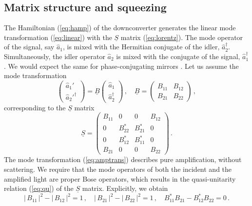 \documentclass[12pt,amsmath,amssymb]{article}
\numberwithin{equation}{section}
\begin{document}
\subsection{Matrix structure and squeezing}

The Hamiltonian (\ref{eq:hamp}) of the downconverter generates
the linear mode transformation (\ref{eq:linear}) with the
$\underline{S}$ matrix (\ref{eq:lorentz}). The mode operator of
the signal, say $\hat{a}_1$, is mixed with the Hermitian
conjugate of the idler, $\hat{a}_2^\dagger$. Simultaneously, the
idler operator $\hat{a}_2$ is mixed with the conjugate of the
signal, $\hat{a}_1^\dagger$. We would expect the same for
phase-conjugating mirrors \cite{Shen}. Let us assume the mode
transformation
\begin{equation}
\label{eq:amptrans} \left(
    \begin{array}{c}
     \hat{a}_1'  \\
     \hat{a}_2'^\dagger
    \end{array}
\right) = \underline{B} \left(
    \begin{array}{c}
     \hat{a}_1  \\
     \hat{a}_2^\dagger
    \end{array}
\right)\,,\quad \underline{B} = \left(
    \begin{array}{cc}
      B_{11} & B_{12} \\
      B_{21} & B_{22}
    \end{array}
\right)\,,
\end{equation}
corresponding to the $\underline{S}$ matrix
\begin{equation}
\label{eq:amps}
\underline{S} =
    \left(
    \begin{array}{cccc}
      B_{11}&0&0&B_{12}\\ 0&B_{22}^*&B_{21}^*&0\\
      0&B_{12}^*&B_{11}^*&0\\ B_{21}&0&0&B_{22}
    \end{array}
\right) \,.
\end{equation}
The mode transformation (\ref{eq:amptrans}) describes pure
amplification, without scattering. We require that the mode
operators of both the incident and the amplified light are proper
Bose operators, which results in the quasi-unitarity relation
(\ref{eq:qu}) of the $\underline{S}$ matrix. Explicitly, we
obtain
\begin{equation}
|\,B_{11}\,|^2-|\,B_{12}\,|^2=1\,,\quad
|\,B_{21}\,|^2-|\,B_{22}\,|^2=1\,,\quad
B_{11}^*B_{21}-B_{12}^*B_{22}=0\,.
\end{equation}
\end{document}
